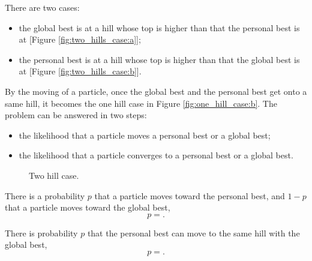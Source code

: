 There are two cases:
\begin{itemize}
\item the global best is at a hill whose top is higher than that the personal best is at [Figure \ref{fig:two_hills_case:a}];
\item the personal best is at a hill whose top is higher than that the global best is at [Figure \ref{fig:two_hills_case:b}]. 
\end{itemize}
By the moving of a particle, once the global best and the personal best get onto a same hill, it becomes the one hill case in Figure \ref{fig:one_hill_case:b}.
The problem can be answered in two steps:
\begin{itemize}
\item the likelihood that a particle moves a personal best or a global best;
\item the likelihood that a particle converges to a personal best or a global best.
\end{itemize}

\begin{figure}
\centering
{}
\caption{Two hill case.}
\label{fig:two_hills_case}
\end{figure}


\begin{theorem}
There is a probability $ p $  that a particle moves toward the personal best, and $ 1 - p $ that a particle moves toward the global best,
\begin{equation}
p = .
\end{equation}
\end{theorem}

\begin{corollary}
There is probability $ p $ that the personal best can move to the same hill with the global best,
\begin{equation}
p = .
\end{equation}
\end{corollary}